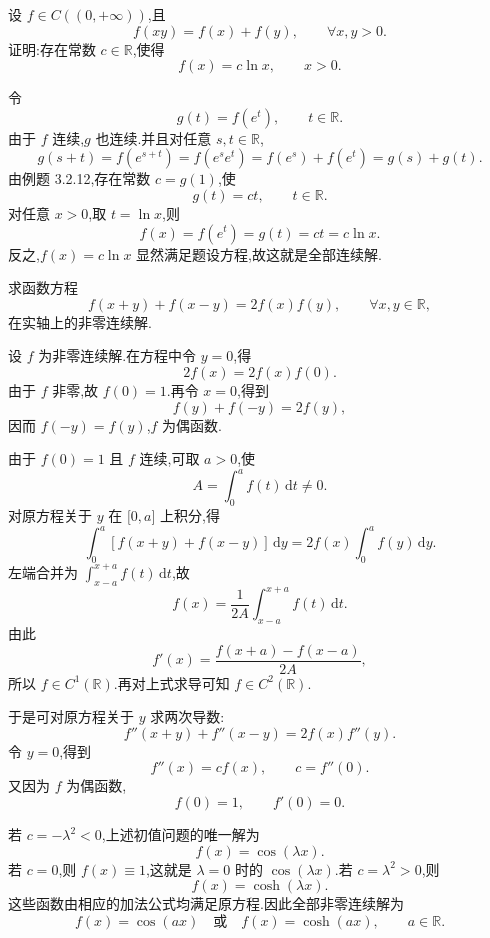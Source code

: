 \begin{example}
    设 $f\in C((0,+\infty))$,且
    \[
        f(xy)=f(x)+f(y),\qquad \forall x,y>0.
    \]
    证明:存在常数 $c\in\mathbb{R}$,使得
    \[
        f(x)=c\ln x,\qquad x>0.
    \]
\end{example}
\exampleblank

\begin{solution}
    令
    \[
        g(t)=f(e^t),\qquad t\in\mathbb{R}.
    \]
    由于 $f$ 连续,$g$ 也连续.并且对任意 $s,t\in\mathbb{R}$,
    \[
        g(s+t)=f(e^{s+t})=f(e^se^t)=f(e^s)+f(e^t)=g(s)+g(t).
    \]
    由例题 3.2.12,存在常数 $c=g(1)$,使
    \[
        g(t)=ct,\qquad t\in\mathbb{R}.
    \]
    对任意 $x>0$,取 $t=\ln x$,则
    \[
        f(x)=f(e^t)=g(t)=ct=c\ln x.
    \]
    反之,$f(x)=c\ln x$ 显然满足题设方程,故这就是全部连续解.
\end{solution}

\begin{example}
    求函数方程
    \[
        f(x+y)+f(x-y)=2f(x)f(y),\qquad \forall x,y\in\mathbb{R},
    \]
    在实轴上的非零连续解.
\end{example}
\exampleblank

\begin{solution}
    设 $f$ 为非零连续解.在方程中令 $y=0$,得
    \[
        2f(x)=2f(x)f(0).
    \]
    由于 $f$ 非零,故 $f(0)=1$.再令 $x=0$,得到
    \[
        f(y)+f(-y)=2f(y),
    \]
    因而 $f(-y)=f(y)$,$f$ 为偶函数.

    由于 $f(0)=1$ 且 $f$ 连续,可取 $a>0$,使
    \[
        A=\int_0^a f(t)\,\mathrm{d}t\neq0.
    \]
    对原方程关于 $y$ 在 $\lbrack0,a\rbrack$ 上积分,得
    \[
        \int_0^a[f(x+y)+f(x-y)]\,\mathrm{d}y
        =2f(x)\int_0^a f(y)\,\mathrm{d}y.
    \]
    左端合并为 $\displaystyle\int_{x-a}^{x+a}f(t)\,\mathrm{d}t$,故
    \[
        f(x)=\dfrac{1}{2A}\int_{x-a}^{x+a}f(t)\,\mathrm{d}t.
    \]
    由此
    \[
        f'(x)=\dfrac{f(x+a)-f(x-a)}{2A},
    \]
    所以 $f\in C^1(\mathbb{R})$.再对上式求导可知 $f\in C^2(\mathbb{R})$.

    于是可对原方程关于 $y$ 求两次导数:
    \[
        f''(x+y)+f''(x-y)=2f(x)f''(y).
    \]
    令 $y=0$,得到
    \[
        f''(x)=cf(x),\qquad c=f''(0).
    \]
    又因为 $f$ 为偶函数,
    \[
        f(0)=1,\qquad f'(0)=0.
    \]

    若 $c=-\lambda^2<0$,上述初值问题的唯一解为
    \[
        f(x)=\cos(\lambda x).
    \]
    若 $c=0$,则 $f(x)\equiv1$,这就是 $\lambda=0$ 时的 $\cos(\lambda x)$.若 $c=\lambda^2>0$,则
    \[
        f(x)=\cosh(\lambda x).
    \]
    这些函数由相应的加法公式均满足原方程.因此全部非零连续解为
    \[
        f(x)=\cos(ax)\quad\text{或}\quad f(x)=\cosh(ax),\qquad a\in\mathbb{R}.
    \]
\end{solution}

